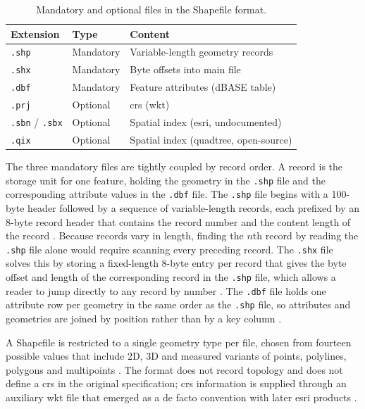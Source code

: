 \begin{table}[H]
    \centering
    \begin{tabular}{lll}
        \toprule
        \textbf{Extension} & \textbf{Type} & \textbf{Content} \\
        \midrule
        \texttt{.shp} & Mandatory & Variable-length geometry records \\
        \texttt{.shx} & Mandatory & Byte offsets into main file \\
        \texttt{.dbf} & Mandatory & Feature attributes (dBASE table) \\
        \texttt{.prj} & Optional & \acrlong{crs} (\acrshort{wkt}) \\
        \texttt{.sbn} / \texttt{.sbx} & Optional & Spatial index (\acrshort{esri}, undocumented) \\
        \texttt{.qix} & Optional & Spatial index (quadtree, open-source) \\
        \bottomrule
    \end{tabular}
    \caption[Shapefile component files.]{Mandatory and optional files in the Shapefile format.}
    \label{tab:shapefile-components}
\end{table}

The three mandatory files are tightly coupled by record order. A record is the storage unit for one feature, holding the geometry in the \texttt{.shp} file and the corresponding attribute values in the \texttt{.dbf} file. The \texttt{.shp} file begins with a 100-byte header followed by a sequence of variable-length records, each prefixed by an 8-byte record header that contains the record number and the content length of the record \parencite{esri1998_shapefile_technical_description}. Because records vary in length, finding the \(n\)th record by reading the \texttt{.shp} file alone would require scanning every preceding record. The \texttt{.shx} file solves this by storing a fixed-length 8-byte entry per record that gives the byte offset and length of the corresponding record in the \texttt{.shp} file, which allows a reader to jump directly to any record by number \parencite{esri1998_shapefile_technical_description}. The \texttt{.dbf} file holds one attribute row per geometry in the same order as the \texttt{.shp} file, so attributes and geometries are joined by position rather than by a key column \parencite{esri1998_shapefile_technical_description}.

A Shapefile is restricted to a single geometry type per file, chosen from fourteen possible values that include 2D, 3D and measured variants of points, polylines, polygons and multipoints \parencite{esri1998_shapefile_technical_description}. The format does not record topology and does not define a \acrfull{crs} in the original specification; \acrshort{crs} information is supplied through an auxiliary \acrfull{wkt} file that emerged as a de facto convention with later \acrshort{esri} products \parencite{esri1998_shapefile_technical_description, gdal2025_shapefile_driver}.

